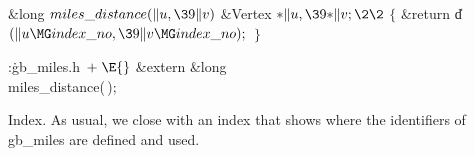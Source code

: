 \Y\B\1\1\&{long} ${}\\{miles\_distance}(\|u,\39\|v){}$\6
\&{Vertex} ${}{*}\|u,\39{*}\|v;\2\2{}$\6
${}\{{}$\1\6
\&{return} \|d${}(\|u\MG\\{index\_no},\39\|v\MG\\{index\_no});{}$\6
\4${}\}{}$\2\par
\fi

\B{}:\.{gb\_miles.h\,}\X${}\mathrel+\E{}$\6
\&{extern} \&{long} \\{miles\_distance}(\,);\par
\fi

Index. As usual, we close with an index that
shows where the identifiers of \\{gb\_miles} are defined and used.
\fi

\inx
\fin
\con
